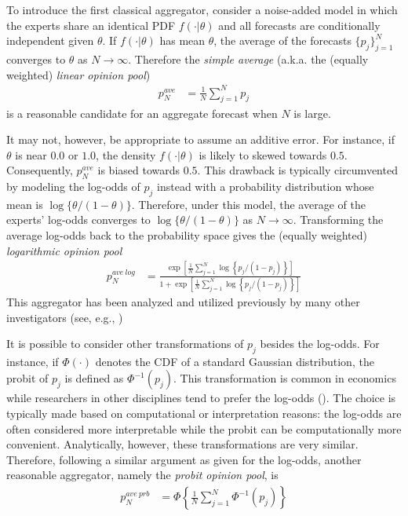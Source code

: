 \documentclass[11pt]{article}
\theoremstyle{definition}
\theoremstyle{definition}
\begin{document}
To introduce the first classical aggregator, consider a noise-added model in which the experts share an identical PDF $f(\cdot | \theta)$ and all forecasts are conditionally independent given $\theta$. If $f(\cdot | \theta)$ has mean $\theta$, the average of the forecasts $\{ p_j \}_{j=1}^N$ converges to $\theta$ as $N \to \infty$. Therefore the \textit{simple average} (a.k.a. the (equally weighted) \textit{linear opinion pool})
\begin{align*}
p_N^{ave} &= \frac{1}{N} \sum_{j=1}^N p_j
\end{align*}
is a reasonable candidate for an aggregate forecast when $N$ is large.

It may not, however, be appropriate to assume an additive error. For instance, if $\theta$ is near $0.0$ or $1.0$,  the density $f(\cdot | \theta)$ is likely to skewed towards $0.5$.  Consequently, $p_{N}^{ave}$ is biased towards $0.5$. This drawback is typically circumvented by modeling the log-odds of $p_j$ instead with a probability distribution whose mean is $\log\{\theta/(1-\theta)\}$. Therefore, under this model, the average of the experts' log-odds converges to $\log\{\theta/(1-\theta)\}$ as $N \to \infty$. Transforming the average log-odds back to the probability space gives the (equally weighted) \textit{logarithmic opinion pool}
\begin{align*}
p_N^{ave\ log} &= \frac{\exp\left[ \frac{1}{N} \sum_{j=1}^N \log\left\{p_j / (1-p_j)\right\} \right]}{1+\exp\left[ \frac{1}{N} \sum_{j=1}^N \log\left\{p_j / (1-p_j)\right\} \right]}
\end{align*}
This aggregator has been analyzed and utilized previously by many other investigators (see, e.g., \citet{dawid1995coherent, Genest, bacharach1975group})

It is possible to consider other transformations of $p_j$ besides the log-odds. For instance,  if $\Phi(\cdot)$ denotes the CDF of a standard Gaussian distribution, the probit of $p_j$ is defined as $\Phi^{-1}(p_j)$. This transformation is common in economics while researchers in other disciplines tend to prefer the log-odds (\citet{bryan2013regression}). The choice is typically made based on computational or interpretation reasons: the log-odds are often considered more interpretable while the probit can be computationally more convenient. Analytically, however, these transformations are very similar. Therefore, following a similar argument as given for the log-odds, another reasonable aggregator, namely the \textit{probit opinion pool}, is
\begin{align*}
p_N^{ave\ prb} &= \Phi \left\{ \frac{1}{N} \sum_{j=1}^N \Phi^{-1}(p_j) \right\}
\end{align*}
\end{document}
